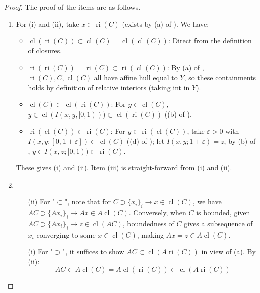 \begin{proof}The proof of the items are as follows.
	\begin{enumerate}[label=(\alph*)]
		\item For (i) and (ii), take $x\in \operatorname{ri}(C)$ (exists by (a) of ). We have:
		      \begin{itemize}
			      \item $\operatorname{cl}(\operatorname{ri}(C))\subset\operatorname{cl}(C)=\operatorname{cl}(\operatorname{cl}(C))$: Direct from the definition of closures.
			      \item $\operatorname{ri}(\operatorname{ri}(C))=\operatorname{ri}(C)\subset\operatorname{ri}(\operatorname{cl}(C))$: By (a) of , $\operatorname{ri}(C),C,\operatorname{cl}(C)$ all have affine hull equal to $Y$, so these containments holds by definition of relative interiors (taking int in $Y$).
			      \item $\operatorname{cl}(C)\subset \operatorname{cl}(\operatorname{ri}(C))$: For $y\in \operatorname{cl}(C)$, $y\in \operatorname{cl}(I(x,y,[0, 1)))\subset \operatorname{cl}(\operatorname{ri}(C))$ ((b) of ).
			      \item $\operatorname{ri}(\operatorname{cl}(C))\subset \operatorname{ri}(C)$: For $y\in \operatorname{ri}(\operatorname{cl}(C))$, take $\varepsilon>0$ with $I(x,y;[0,1+\varepsilon ])\subset \operatorname{cl}(C)$ ((d) of ); let $I(x,y;1+\varepsilon)=z$, by (b) of , $y\in I(x,z;[0, 1))\subset \operatorname{ri}(C)$.
		      \end{itemize}
		      These gives (i) and (ii). Item (iii) is straight-forward from (i) and (ii).
		\item
		      \begin{itemize}
			      \item[(ii)] For "$\subset$", note that for $C\supset \{x_i\}_i\to x\in \operatorname{cl}(C)$, we have $AC\supset \{Ax_i\}_{i}\to Ax\in A\operatorname{cl}(C)$. Conversely, when $C$ is bounded, given $AC\supset \{Ax_i\}_i\to z\in \operatorname{cl}(AC)$, boundedness of $C$ gives a subsequence of $x_i$ converging to some $x\in \operatorname{cl}(C)$, making $Ax=z\in A\operatorname{cl}(C)$.
			      \item[(i)] For "$\supset$", it suffices to show $AC\subset \operatorname{cl}(A \operatorname{ri}(C))$ in view of (a). By (ii):
			            \[
				            AC\subset A \operatorname{cl}(C) = A\operatorname{cl}(\operatorname{ri}(C)) \subset \operatorname{cl}(A \operatorname{ri}(C))
\]
\end{itemize}
\end{enumerate}
\end{proof}
